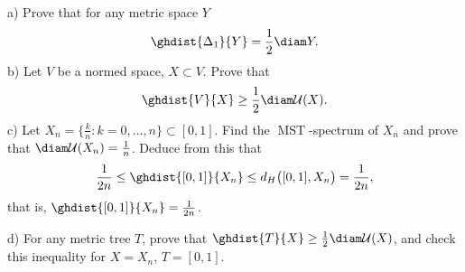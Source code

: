 \documentclass[a4paper,12pt]{report}
\begin{document}
\begin{task}
\textup{a)} Prove that for any metric space $Y$
\[
\ghdist{\Delta_1}{Y}=\frac12\diam Y .
\]
\textup{b)} Let $V$ be a normed space, $X\subset V$. Prove that
\[
\ghdist{V}{X}\ge\frac12\diam\mathcal U(X).
\]
\textup{c)} Let $X_n=\bigl\{\frac{k}{n}: k=0,\dots,n\bigr\}\subset[0,1]$. Find the $\operatorname{MST}$-spectrum of $X_n$ and prove that $\diam\mathcal U(X_n)=\frac1n$. Deduce from this that
\[
\frac{1}{2n}\le\ghdist{[0,1]}{X_n}\le d_H\bigl([0,1],X_n\bigr)=\frac{1}{2n},
\]
that is, $\ghdist{[0,1]}{X_n}=\frac{1}{2n}$.

\textup{d)} For any metric tree $T$, prove that $\ghdist{T}{X}\ge\frac12\diam\mathcal U(X)$, and check this inequality for $X=X_n$, $T=[0,1]$.

\end{task}
\end{document}
